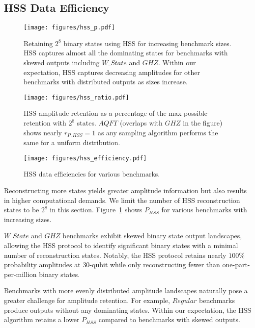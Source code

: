 \subsection{HSS Data Efficiency}
\begin{figure}[t]
    \centering
    \texttt{[image: figures/hss\_p.pdf]}
    \caption{Retaining $2^8$ binary states using HSS for increasing benchmark sizes.
    HSS captures almost all the dominating states for benchmarks with skewed outputs
    including $W\_State$ and $GHZ$.
    Within our expectation,
    HSS captures decreasing amplitudes for other benchmarks with distributed outputs as sizes increase.
    }
    \label{fig:hss_p}
\end{figure}

\begin{figure}[t]
    \centering
    \texttt{[image: figures/hss\_ratio.pdf]}
    \caption{
    HSS amplitude retention as a percentage of the max possible retention with $2^8$ states.
    $AQFT$ (overlaps with $GHZ$ in the figure) shows nearly $r_{P,HSS}=1$ as any sampling algorithm performs the same for a uniform distribution.
    }
    \label{fig:hss_ratio}
\end{figure}

\begin{figure}[t]
    \centering
    \texttt{[image: figures/hss\_efficiency.pdf]}
    \caption{HSS data efficiencies for various benchmarks.
    }
    \label{fig:hss_efficiency}
\end{figure}

Reconstructing more states yields greater amplitude information
but also results in higher computational demands.
We limit the number of HSS reconstruction states to be $2^8$ in this section.
Figure~\ref{fig:hss_p} shows $P_{HSS}$ for various benchmarks with increasing sizes.

$W\_State$ and $GHZ$ benchmarks exhibit skewed binary state output landscapes,
allowing the HSS protocol to identify significant binary states with a minimal number of reconstruction states.
Notably, the HSS protocol retains nearly $100\%$ probability amplitudes at $30$-qubit while only reconstructing fewer than one-part-per-million binary states.

Benchmarks with more evenly distributed amplitude landscapes naturally pose a greater challenge for amplitude retention.
For example, $Regular$ benchmarks produce outputs without any dominating states.
Within our expectation,
the HSS algorithm retains a lower $P_{HSS}$ compared to benchmarks with skewed outputs.

